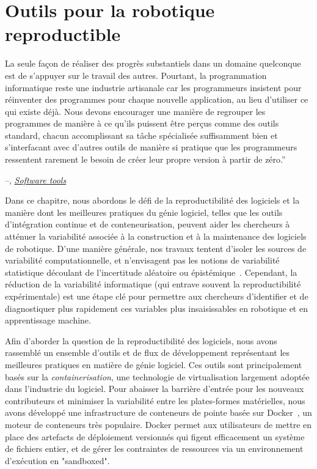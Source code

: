 \chapter{Outils pour la robotique reproductible}\label{ch:ducker}

\setlength{\epigraphwidth}{0.93\textwidth}
\epigraph{La seule façon de réaliser des progrès substantiels dans un domaine quelconque est de s'appuyer sur le travail des autres. Pourtant, la programmation informatique reste une industrie artisanale car les programmeurs insistent pour réinventer des programmes pour chaque nouvelle application, au lieu d'utiliser ce qui existe déjà. Nous devons encourager une manière de regrouper les programmes de manière à ce qu'ils puissent être perçus comme des outils standard, chacun accomplissant sa tâche spécialisée suffisamment bien et s'interfacant avec d'autres outils de manière si pratique que les programmeurs ressentent rarement le besoin de créer leur propre version à partir de zéro.''}{\begin{flushright}--\citet{kernighan1976software}, \href{https://dl.acm.org/doi/10.1145/1010726.1010728}{\textit{Software tools}}\end{flushright}}

Dans ce chapitre, nous abordons le défi de la reproductibilité des logiciels et la manière dont les meilleures pratiques du génie logiciel, telles que les outils d'intégration continue et de conteneurisation, peuvent aider les chercheurs à atténuer la variabilité associée à la construction et à la maintenance des logiciels de robotique. D'une manière générale, nos travaux tentent d'isoler les sources de variabilité computationnelle, et n'envisagent pas les notions de variabilité statistique découlant de l'incertitude aléatoire ou épistémique~\citep{diaz2018interactive}. Cependant, la réduction de la variabilité informatique (qui entrave souvent la reproductibilité expérimentale) est une étape clé pour permettre aux chercheurs d'identifier et de diagnostiquer plus rapidement ces variables plus insaisissables en robotique et en apprentissage machine.

Afin d'aborder la question de la reproductibilité des logiciels, nous avons rassemblé un ensemble d'outils et de flux de développement représentant les meilleures pratiques en matière de génie logiciel. Ces outils sont principalement basés sur la \textit{containerisation}, une technologie de virtualisation largement adoptée dans l'industrie du logiciel. Pour abaisser la barrière d'entrée pour les nouveaux contributeurs et minimiser la variabilité entre les plates-formes matérielles, nous avons développé une infrastructure de conteneurs de pointe basée sur Docker~\citep{merkel2014docker}, un moteur de conteneurs très populaire. Docker permet aux utilisateurs de mettre en place des artefacts de déploiement versionnés qui figent efficacement un système de fichiers entier, et de gérer les contraintes de ressources via un environnement d'exécution en "sandboxed".

